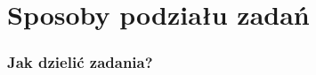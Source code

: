 \section{Sposoby podziału zadań}
\label{podzial_zadan}

\begin{frame}
    \frametitle{Jak dzielić zadania?}

    

\end{frame}